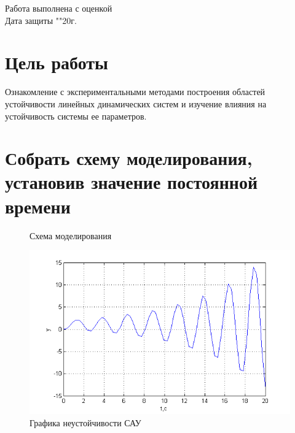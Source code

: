 \documentclass[a4paper, 11pt] {article}
\begin{document}
\begin{titlepage}
		Работа выполнена с оценкой \hspace{1cm} \underline{\hspace{8cm}} \\ 
		\vspace{1cm}
		Дата защиты "\underline{\hspace{0.7cm}}"\hspace{0.2cm}\underline{\hspace{2cm}}\hspace{0.2cm}20\underline{\hspace{0.7cm}}г.

	\end{titlepage}

\section*{Цель работы}
Ознакомление с экспериментальными методами построения областей устойчивости линейных динамических систем и изучение влияния на устойчивость системы ее параметров.

\section{Собрать схему моделирования, установив значение постоянной времени}


\begin{figure}[h]
	\centering
	\caption{Схема моделирования}
	\label{fig:0}
\end{figure}

\begin{figure}[h]
	\centering
	\includegraphics[width=0.7\linewidth]{1}
	\caption{Графика неустойчивости САУ}
	\label{fig:1}
\end{figure}
\end{document}
